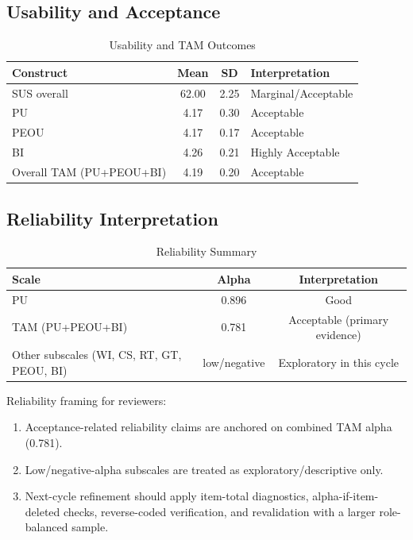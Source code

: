 \documentclass[conference]{IEEEtran}
\begin{document}
\subsection{Usability and Acceptance}
\begin{table}[htbp]
\caption{Usability and TAM Outcomes}
\centering
\begin{tabular}{lccp{1.6cm}}
\toprule
Construct & Mean & SD & Interpretation \\
\midrule
SUS overall & 62.00 & 2.25 & Marginal/Acceptable \\
PU & 4.17 & 0.30 & Acceptable \\
PEOU & 4.17 & 0.17 & Acceptable \\
BI & 4.26 & 0.21 & Highly Acceptable \\
Overall TAM (PU+PEOU+BI) & 4.19 & 0.20 & Acceptable \\
\bottomrule
\end{tabular}
\end{table}

\subsection{Reliability Interpretation}
\begin{table}[htbp]
\caption{Reliability Summary}
\centering
\begin{tabular}{lcc}
\toprule
Scale & Alpha & Interpretation \\
\midrule
PU & 0.896 & Good \\
TAM (PU+PEOU+BI) & 0.781 & Acceptable (primary evidence) \\
Other subscales (WI, CS, RT, GT, PEOU, BI) & low/negative & Exploratory in this cycle \\
\bottomrule
\end{tabular}
\end{table}

Reliability framing for reviewers:
\begin{enumerate}
    \item Acceptance-related reliability claims are anchored on combined TAM alpha (0.781).
    \item Low/negative-alpha subscales are treated as exploratory/descriptive only.
    \item Next-cycle refinement should apply item-total diagnostics, alpha-if-item-deleted checks, reverse-coded verification, and revalidation with a larger role-balanced sample.
\end{enumerate}
\end{document}
